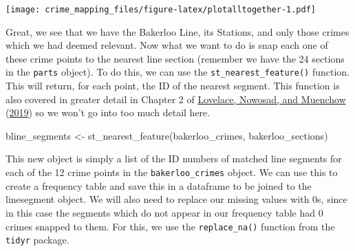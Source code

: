 \documentclass[
  krantz2]{krantz}
\makeatletter
\newenvironment{Shaded}{\begin{snugshade}}{\end{snugshade}}
\newcommand{\AttributeTok}[1]{\textcolor[rgb]{0.61,0.61,0.61}{#1}}
\newcommand{\CommentTok}[1]{\textcolor[rgb]{0.37,0.37,0.37}{\textit{#1}}}
\newcommand{\DecValTok}[1]{\textcolor[rgb]{0.06,0.06,0.06}{#1}}
\newcommand{\FunctionTok}[1]{\textcolor[rgb]{0,0,0}{#1}}
\newcommand{\NormalTok}[1]{#1}
\newcommand{\OtherTok}[1]{\textcolor[rgb]{0.37,0.37,0.37}{#1}}
\newcommand{\SpecialCharTok}[1]{\textcolor[rgb]{0,0,0}{#1}}
\newcommand{\StringTok}[1]{\textcolor[rgb]{0.5,0.5,0.5}{#1}}
\newenvironment{kframe}{%
\medskip{}
\setlength{\fboxsep}{.8em}
 \def\at@end@of@kframe{}%
 \ifinner\ifhmode%
  \def\at@end@of@kframe{\end{minipage}}%
  \begin{minipage}{\columnwidth}%
 \fi\fi%
 \def\FrameCommand##1{\hskip\@totalleftmargin \hskip-\fboxsep
 \colorbox{shadecolor}{##1}\hskip-\fboxsep
     \hskip-\linewidth \hskip-\@totalleftmargin \hskip\columnwidth}%
 \MakeFramed {\advance\hsize-\width
   \@totalleftmargin\z@ \linewidth\hsize
   \@setminipage}}%
 {\par\unskip\endMakeFramed%
 \at@end@of@kframe}
\renewenvironment{Shaded}{\begin{kframe}}{\end{kframe}}
\makeatother
\begin{document}
\texttt{[image: crime\_mapping\_files/figure-latex/plotalltogether-1.pdf]}

Great, we see that we have the Bakerloo Line, its Stations, and only those crimes which we had deemed relevant. Now what we want to do is snap each one of these crime points to the nearest line section (remember we have the 24 sections in the \texttt{parts} object). To do this, we can use the \texttt{st\_nearest\_feature()} function. This will return, for each point, the ID of the nearest segment. This function is also covered in greater detail in Chapter 2 of \protect\hyperlink{ref-Lovelace_2019}{Lovelace, Nowosad, and Muenchow} (\protect\hyperlink{ref-Lovelace_2019}{2019}) so we won't go into too much detail here.

\begin{Shaded}
\begin{Highlighting}[]
\NormalTok{bline\_segments }\OtherTok{\textless{}{-}} \FunctionTok{st\_nearest\_feature}\NormalTok{(bakerloo\_crimes, bakerloo\_sections)}
\end{Highlighting}
\end{Shaded}

This new object is simply a list of the ID numbers of matched line segments for each of the 12 crime points in the \texttt{bakerloo\_crimes} object. We can use this to create a frequency table and save this in a dataframe to be joined to the linesegment object. We will also need to replace our missing values with 0s, since in this case the segments which do not appear in our frequency table had 0 crimes snapped to them. For this, we use the \texttt{replace\_na()} function from the \texttt{tidyr} package.

\begin{Shaded}
\end{Shaded}
\end{document}
